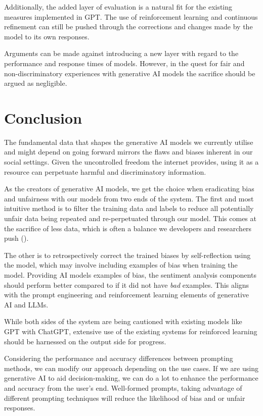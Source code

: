 \documentclass[12pt]{article}
\begin{document}
Additionally, the added layer of evaluation is a natural fit for the existing measures implemented in GPT. The use of reinforcement learning and continuous refinement can still be pushed through the corrections and changes made by the model to its own responses.

Arguments can be made against introducing a new layer with regard to the performance and response times of models. However, in the quest for fair and non-discriminatory experiences with generative AI models the sacrifice should be argued as negligible.

\newpage

\section{Conclusion}

The fundamental data that shapes the generative AI models we currently utilise and might depend on going forward mirrors the flaws and biases inherent in our social settings. Given the uncontrolled freedom the internet provides, using it as a resource can perpetuate harmful and discriminatory information.  

As the creators of generative AI models, we get the choice when eradicating bias and unfairness with our models from two ends of the system. The first and most intuitive method is to filter the training data and labels to reduce all potentially unfair data being repeated and re-perpetuated through our model. This comes at the sacrifice of less data, which is often a balance we developers and researchers push (\cite{li-2023}).

The other is to retrospectively correct the trained biases by self-reflection using the model, which may involve including examples of bias when training the model. Providing AI models examples of bias, the sentiment analysis components should perform better compared to if it did not have \textit{bad} examples. This aligns with the prompt engineering and reinforcement learning elements of generative AI and LLMs. 

While both sides of the system are being cautioned with existing models like GPT with ChatGPT, extensive use of the existing systems for reinforced learning should be harnessed on the output side for progress.

Considering the performance and accuracy differences between prompting methods, we can modify our approach depending on the use cases. If we are using generative AI to aid decision-making, we can do a lot to enhance the performance and accuracy from the user's end. Well-formed prompts, taking advantage of different prompting techniques will reduce the likelihood of bias and or unfair responses.
\end{document}
